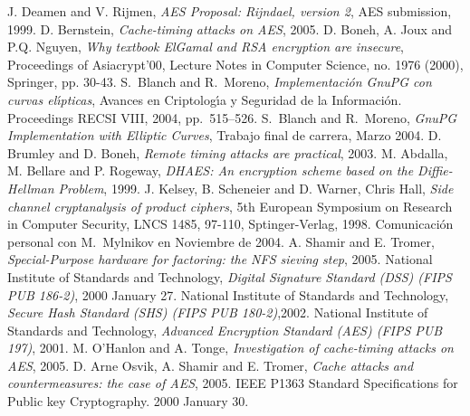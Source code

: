 \documentclass{llncs}
\theoremstyle{plain}        			%
\theoremstyle{definition}   			%
\theoremstyle{saltolinea}   			%
\begin{document}
\begin{thebibliography}{BM04}

J. Deamen and V. Rijmen, \textit{AES Proposal: Rijndael, version 2}, AES submission, 1999.
D. Bernstein, \textit{Cache-timing attacks on AES}, 2005.
D. Boneh, A. Joux and P.Q. Nguyen, \textit{Why textbook ElGamal and RSA encryption are insecure}, Proceedings of Asiacrypt'00, Lecture Notes in Computer Science, no. 1976 (2000), Springer, pp. 30-43.
S.~Blanch and R.~Moreno, \emph{Implementaci\'on {GnuPG} con curvas el\'{\i}pticas}, Avances en Criptolog\'{\i}a y Seguridad de la Informaci\'on. Proceedings {RECSI VIII}, 2004, pp.~515--526.
S.~Blanch and R.~Moreno, \emph{GnuPG Implementation with Elliptic Curves}, Trabajo final de carrera, Marzo 2004.
D. Brumley and D. Boneh, \textit{Remote timing attacks are practical}, 2003.
M. Abdalla, M. Bellare and P. Rogeway, \textit{DHAES: An encryption scheme based on the Diffie-Hellman Problem}, 1999.
J. Kelsey, B. Scheneier and D. Warner, Chris Hall, \textit{Side channel cryptanalysis of product ciphers}, 5th European Symposium on Research in Computer Security, LNCS 1485, 97-110, Sptinger-Verlag, 1998.
Comunicaci\'on personal con M.~Mylnikov en Noviembre de 2004.
A. Shamir and E. Tromer, \textit{Special-Purpose hardware for factoring: the NFS sieving step}, 2005.
National Institute of Standards and Technology, \textit{Digital Signature Standard (DSS) (FIPS PUB 186-2)}, 2000 January 27.
National Institute of Standards and Technology, \textit{Secure Hash Standard (SHS) (FIPS PUB 180-2)},2002.
National Institute of Standards and Technology, \textit{Advanced Encryption Standard (AES) (FIPS PUB 197)}, 2001.
M. O'Hanlon and A. Tonge, \textit{Investigation of cache-timing attacks on AES}, 2005.
D. Arne Osvik, A. Shamir and E. Tromer, \textit{Cache attacks and countermeasures: the case of AES}, 2005.
IEEE P1363 Standard Specifications for Public key Cryptography. 2000 January 30.

\end{thebibliography}
\end{document}
